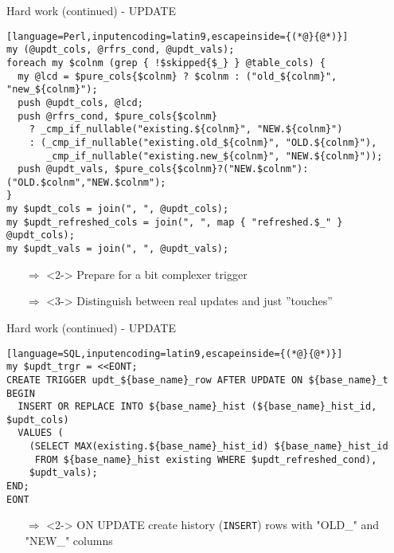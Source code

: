 \documentclass[ngerman,xcolor={table,dvipsnames},smaller,compress,hyperref={bookmarks,colorlinks}]{beamer}%
\begin{document}
\begin{frame}[fragile]{}
\begin{block}{Hard work (continued) - UPDATE}
\scriptsize
\begin{lstlisting}[language=Perl,inputencoding=latin9,escapeinside={(*@}{@*)}]
my (@updt_cols, @rfrs_cond, @updt_vals);
foreach my $colnm (grep { !$skipped{$_} } @table_cols) {
  my @lcd = $pure_cols{$colnm} ? $colnm : ("old_${colnm}", "new_${colnm}");
  push @updt_cols, @lcd;
  push @rfrs_cond, $pure_cols{$colnm}
    ? _cmp_if_nullable("existing.${colnm}", "NEW.${colnm}")
    : (_cmp_if_nullable("existing.old_${colnm}", "OLD.${colnm}"),
       _cmp_if_nullable("existing.new_${colnm}", "NEW.${colnm}"));
  push @updt_vals, $pure_cols{$colnm}?("NEW.$colnm"):("OLD.$colnm","NEW.$colnm");
}
my $updt_cols = join(", ", @updt_cols);
my $updt_refreshed_cols = join(", ", map { "refreshed.$_" } @updt_cols);
my $updt_vals = join(", ", @updt_vals);
\end{lstlisting}
\end{block}

\begin{itemize}
\item[$\Rightarrow$]<2-> Prepare for a bit complexer trigger
\item[$\Rightarrow$]<3-> Distinguish between real updates and just ''touches''
\end{itemize}

\end{frame}

\begin{frame}[fragile]{}
\begin{block}{Hard work (continued) - UPDATE}
\scriptsize
\begin{lstlisting}[language=SQL,inputencoding=latin9,escapeinside={(*@}{@*)}]
my $updt_trgr = <<EONT;
CREATE TRIGGER updt_${base_name}_row AFTER UPDATE ON ${base_name}_t
BEGIN
  INSERT OR REPLACE INTO ${base_name}_hist (${base_name}_hist_id, $updt_cols)
  VALUES (
    (SELECT MAX(existing.${base_name}_hist_id) ${base_name}_hist_id
     FROM ${base_name}_hist existing WHERE $updt_refreshed_cond),
    $updt_vals);
END;
EONT
\end{lstlisting}
\end{block}

\begin{itemize}
\item[$\Rightarrow$]<2-> ON UPDATE create history (\texttt{INSERT}) rows with "OLD\_"  and "NEW\_" columns \\
\end{itemize}
\end{frame}
\end{document}
